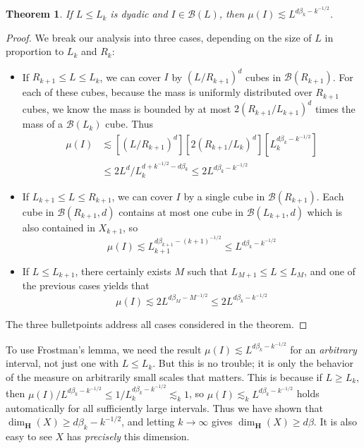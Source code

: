 \documentclass{article}
\theoremstyle{plain}
\theoremstyle{plain}
\newtheorem{theorem}{Theorem}
\begin{document}
\begin{theorem}
	If $L \leq L_k$ is dyadic and $I \in \mathcal{B}(L)$, then $\mu(I) \lesssim L^{d\beta_k - k^{-1/2}}$.
\end{theorem}
\begin{proof}
	We break our analysis into three cases, depending on the size of $L$ in proportion to $L_k$ and $R_k$:
	\begin{itemize}
		\item If $R_{k+1} \leq L \leq L_k$, we can cover $I$ by $(L/R_{k+1})^d$ cubes in $\mathcal{B}(R_{k+1})$. For each of these cubes, because the mass is uniformly distributed over $R_{k+1}$ cubes, we know the mass is bounded by at most $2(R_{k+1}/L_{k+1})^d$ times the mass of a $\mathcal{B}(L_k)$ cube. Thus
		\begin{align*}
			\mu(I) &\lesssim [(L/R_{k+1})^d] [2(R_{k+1}/L_k)^d] [L_k^{d \beta_k - k^{-1/2}}]\\
			&\leq 2 L^d / L_k^{d + k^{-1/2} - d \beta_k} \leq 2 L^{d \beta_k - k^{-1/2}}
		\end{align*}

		\item If $L_{k+1} \leq L \leq R_{k+1}$, we can cover $I$ by a single cube in $\mathcal{B}(R_{k+1})$. Each cube in $\mathcal{B}(R_{k+1},d)$ contains at most one cube in $\mathcal{B}(L_{k+1},d)$ which is also contained in $X_{k+1}$, so
		\[ \mu(I) \lesssim L_{k+1}^{d\beta_{k+1} - (k+1)^{-1/2}} \leq L^{d \beta_k - k^{-1/2}} \]

		\item If $L \leq L_{k+1}$, there certainly exists $M$ such that $L_{M+1} \leq L \leq L_M$, and one of the previous cases yields that
		\[ \mu(I) \lesssim 2 L^{d \beta_M - M^{-1/2}} \leq 2 L^{d \beta_k - k^{-1/2}} \]
	\end{itemize}
	The three bulletpoints address all cases considered in the theorem.
\end{proof}

To use Frostman's lemma, we need the result $\mu(I) \lesssim L^{d \beta_k - k^{-1/2}}$ for an {\it arbitrary} interval, not just one with $L \leq L_k$. But this is no trouble; it is only the behavior of the measure on arbitrarily small scales that matters. This is because if $L \geq L_k$, then $\mu(I)/L^{d \beta_k - k^{-1/2}} \leq 1/L_k^{d \beta_k - k^{-1/2}} \lesssim_k 1$, so $\mu(I) \lesssim_k L^{d \beta_k - k^{-1/2}}$ holds automatically for all sufficiently large intervals. Thus we have shown that $\dim_{\mathbf{H}}(X) \geq d \beta_k - k^{-1/2}$, and letting $k \to \infty$ gives $\dim_{\mathbf{H}}(X) \geq d \beta$. It is also easy to see $X$ has {\it precisely} this dimension.
\end{document}
